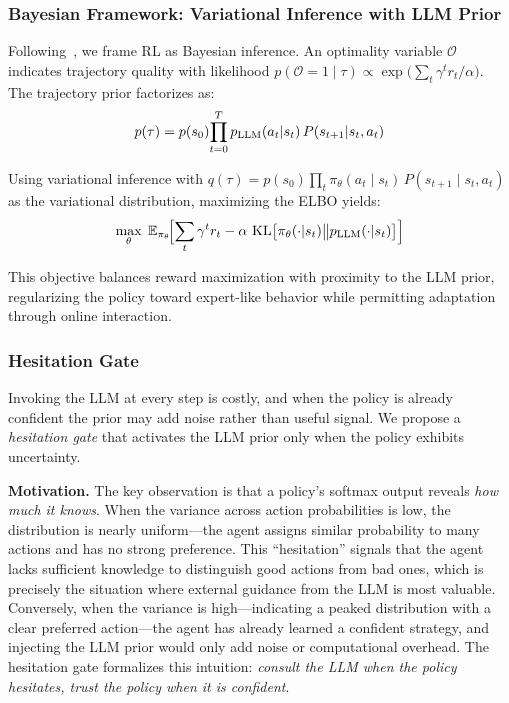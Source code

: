 \documentclass[conference]{IEEEtran}
\DeclareMathOperator{\KL}{KL}
\begin{document}
\subsubsection{Bayesian Framework: Variational Inference with LLM Prior}

Following~\cite{yan2024efficient, levine2018reinforcement}, we frame RL as Bayesian inference. An optimality variable $\mathcal{O}$ indicates trajectory quality with likelihood $p(\mathcal{O}{=}1 \mid \tau) \propto \exp\!\bigl(\sum_t \gamma^t r_t / \alpha\bigr)$. The trajectory prior factorizes as:
\begin{equation}
\small
p(\tau) = p(s_0)\!\prod_{t=0}^{T} p_{\mathrm{LLM}}(a_t | s_t)\, P(s_{t+1} | s_t, a_t)
\end{equation}

Using variational inference with $q(\tau) = p(s_0)\prod_t \pi_\theta(a_t \mid s_t)\,P(s_{t+1} \mid s_t, a_t)$ as the variational distribution, maximizing the ELBO yields:
\begin{equation}
\small
\max_\theta\; \mathbb{E}_{\pi_\theta}\!\Bigl[\sum_{t} \gamma^t r_t - \alpha \, \KL\bigl[\pi_\theta(\cdot|s_t) \big\| p_{\mathrm{LLM}}(\cdot|s_t)\bigr]\Bigr]
\label{eq:vi_objective}
\end{equation}

This objective balances reward maximization with proximity to the LLM prior, regularizing the policy toward expert-like behavior while permitting adaptation through online interaction.

\subsubsection{Hesitation Gate}

Invoking the LLM at every step is costly, and when the policy is already confident the prior may add noise rather than useful signal. We propose a \textit{hesitation gate} that activates the LLM prior only when the policy exhibits uncertainty.

\textbf{Motivation.}
The key observation is that a policy's softmax output reveals \textit{how much it knows}.
When the variance across action probabilities is low, the distribution is nearly uniform---the agent assigns similar probability to many actions and has no strong preference.
This ``hesitation'' signals that the agent lacks sufficient knowledge to distinguish good actions from bad ones, which is precisely the situation where external guidance from the LLM is most valuable.
Conversely, when the variance is high---indicating a peaked distribution with a clear preferred action---the agent has already learned a confident strategy, and injecting the LLM prior would only add noise or computational overhead.
The hesitation gate formalizes this intuition: \textit{consult the LLM when the policy hesitates, trust the policy when it is confident}.
\end{document}
